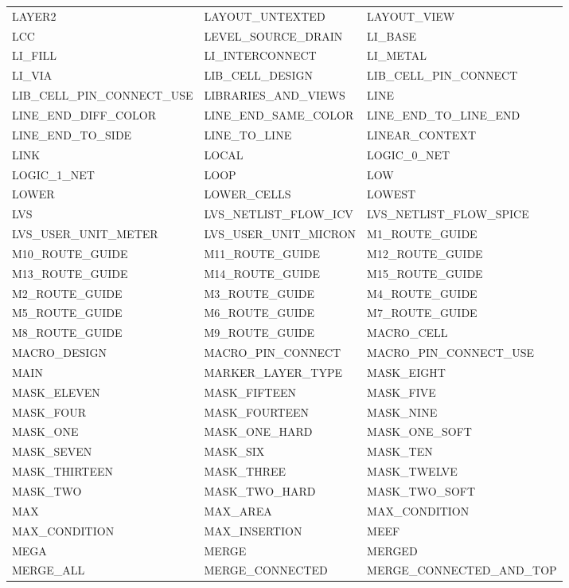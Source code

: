 \begin{longtable}{@{}>{\raggedright\arraybackslash\ttfamily}p{} >{\raggedright\arraybackslash\ttfamily}p{} >{\raggedright\arraybackslash\ttfamily}p{}@{}}
LAYER2 & LAYOUT\_UNTEXTED & LAYOUT\_VIEW \\
LCC & LEVEL\_SOURCE\_DRAIN & LI\_BASE \\
LI\_FILL & LI\_INTERCONNECT & LI\_METAL \\
LI\_VIA & LIB\_CELL\_DESIGN & LIB\_CELL\_PIN\_CONNECT \\
LIB\_CELL\_PIN\_CONNECT\_USE & LIBRARIES\_AND\_VIEWS & LINE \\
LINE\_END\_DIFF\_COLOR & LINE\_END\_SAME\_COLOR & LINE\_END\_TO\_LINE\_END \\
LINE\_END\_TO\_SIDE & LINE\_TO\_LINE & LINEAR\_CONTEXT \\
LINK & LOCAL & LOGIC\_0\_NET \\
LOGIC\_1\_NET & LOOP & LOW \\
LOWER & LOWER\_CELLS & LOWEST \\
LVS & LVS\_NETLIST\_FLOW\_ICV & LVS\_NETLIST\_FLOW\_SPICE \\
LVS\_USER\_UNIT\_METER & LVS\_USER\_UNIT\_MICRON & M1\_ROUTE\_GUIDE \\
M10\_ROUTE\_GUIDE & M11\_ROUTE\_GUIDE & M12\_ROUTE\_GUIDE \\
M13\_ROUTE\_GUIDE & M14\_ROUTE\_GUIDE & M15\_ROUTE\_GUIDE \\
M2\_ROUTE\_GUIDE & M3\_ROUTE\_GUIDE & M4\_ROUTE\_GUIDE \\
M5\_ROUTE\_GUIDE & M6\_ROUTE\_GUIDE & M7\_ROUTE\_GUIDE \\
M8\_ROUTE\_GUIDE & M9\_ROUTE\_GUIDE & MACRO\_CELL \\
MACRO\_DESIGN & MACRO\_PIN\_CONNECT & MACRO\_PIN\_CONNECT\_USE \\
MAIN & MARKER\_LAYER\_TYPE & MASK\_EIGHT \\
MASK\_ELEVEN & MASK\_FIFTEEN & MASK\_FIVE \\
MASK\_FOUR & MASK\_FOURTEEN & MASK\_NINE \\
MASK\_ONE & MASK\_ONE\_HARD & MASK\_ONE\_SOFT \\
MASK\_SEVEN & MASK\_SIX & MASK\_TEN \\
MASK\_THIRTEEN & MASK\_THREE & MASK\_TWELVE \\
MASK\_TWO & MASK\_TWO\_HARD & MASK\_TWO\_SOFT \\
MAX & MAX\_AREA & MAX\_CONDITION \\
MAX\_CONDITION & MAX\_INSERTION & MEEF \\
MEGA & MERGE & MERGED \\
MERGE\_ALL & MERGE\_CONNECTED & MERGE\_CONNECTED\_AND\_TOP \\

\end{longtable}
